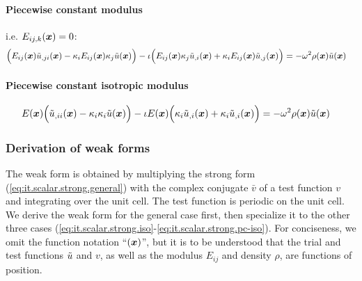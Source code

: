 \paragraph{Piecewise constant modulus} i.e. \(E_{ij,k}(\boldsymbol{x}) = 0\):
%
\begin{align}
    \Bigl(
        E_{ij}(\boldsymbol{x}) \tilde{u}_{,ji}(\boldsymbol{x})
        - \kappa_{i} E_{ij}(\boldsymbol{x}) \kappa_{j} \tilde{u}(\boldsymbol{x})
    \Bigr) - \iota \Bigl(
        E_{ij}(\boldsymbol{x}) \kappa_{j} \tilde{u}_{,i}(\boldsymbol{x})
        + \kappa_{i} E_{ij}(\boldsymbol{x}) \tilde{u}_{,j}(\boldsymbol{x})
    \Bigr) &=
    -\omega^2 \rho(\boldsymbol{x}) \tilde{u}(\boldsymbol{x}) \label{eq:it.scalar.strong.pc}
\end{align}

\paragraph{Piecewise constant isotropic modulus}
%
\begin{align}
    E(\boldsymbol{x}) \Bigl(
        \tilde{u}_{,ii}(\boldsymbol{x})
        - \kappa_{i} \kappa_{i} \tilde{u}(\boldsymbol{x})
    \Bigr) - \iota E(\boldsymbol{x}) \Bigl(
        \kappa_{i} \tilde{u}_{,i}(\boldsymbol{x}) + \kappa_{i} \tilde{u}_{,i}(\boldsymbol{x})
    \Bigr) &=
    -\omega^2 \rho(\boldsymbol{x}) \tilde{u}(\boldsymbol{x}) \label{eq:it.scalar.strong.pc-iso}
\end{align}


\subsubsection{Derivation of weak forms} \label{sec:it.scalar.weak-derivation}

The weak form is obtained by multiplying the strong form (\ref{eq:it.scalar.strong.general}) with the complex conjugate \(\bar{v}\) of a test function \(v\) and integrating over the unit cell. The test function is periodic on the unit cell. We derive the weak form for the general case first, then specialize it to the other three cases (\ref{eq:it.scalar.strong.iso}-\ref{eq:it.scalar.strong.pc-iso}). For conciseness, we omit the function notation ``\((\boldsymbol{x})\)'', but it is to be understood that the trial and test functions \(\tilde{u}\) and \(v\), as well as the modulus \(E_{ij}\) and density \(\rho\), are functions of position.

